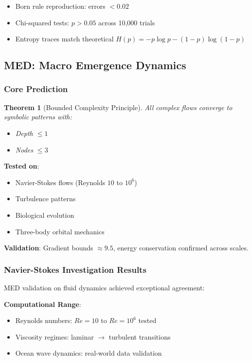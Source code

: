 \documentclass[11pt,a4paper]{article}
\newtheorem{theorem}{Theorem}
\begin{document}
\begin{itemize}
    \item Born rule reproduction: errors $< 0.02$
    \item Chi-squared tests: $p > 0.05$ across 10,000 trials
    \item Entropy traces match theoretical $H(p) = -p \log p - (1-p) \log(1-p)$
\end{itemize}

\subsection{MED: Macro Emergence Dynamics}

\subsubsection{Core Prediction}

\begin{theorem}[Bounded Complexity Principle]
All complex flows converge to symbolic patterns with:
\begin{itemize}
    \item Depth $\leq 1$
    \item Nodes $\leq 3$
\end{itemize}
\end{theorem}

\textbf{Tested on}:
\begin{itemize}
    \item Navier-Stokes flows (Reynolds $10$ to $10^6$)
    \item Turbulence patterns
    \item Biological evolution
    \item Three-body orbital mechanics
\end{itemize}

\textbf{Validation}: Gradient bounds $\approx 9.5$, energy conservation confirmed across scales.

\subsubsection{Navier-Stokes Investigation Results}

MED validation on fluid dynamics achieved exceptional agreement:

\textbf{Computational Range}:
\begin{itemize}
    \item Reynolds numbers: $Re = 10$ to $Re = 10^6$ tested
    \item Viscosity regimes: laminar $\to$ turbulent transitions
    \item Ocean wave dynamics: real-world data validation
\end{itemize}
\end{document}
